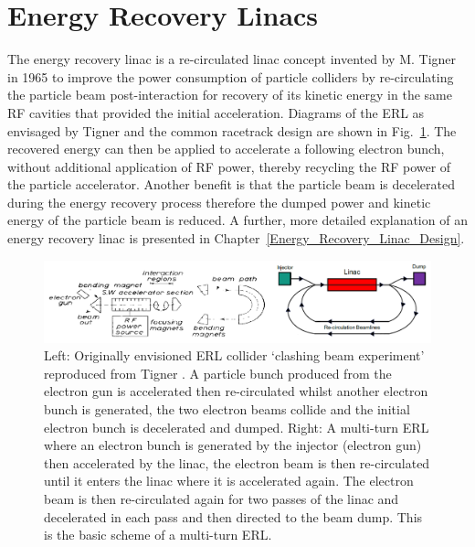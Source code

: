 \documentclass[../main.tex]{subfiles}
\begin{document}
\section{Energy Recovery Linacs}

The energy recovery linac is a re-circulated linac concept invented by M. Tigner in 1965 \cite{tigner1965possible} to improve the power consumption of particle colliders by re-circulating the particle beam post-interaction for recovery of its kinetic energy in the same RF cavities that provided the initial acceleration. Diagrams of the ERL as envisaged by Tigner and the common racetrack design are shown in Fig.~\ref{fig:tigner_modern_ERL}. The recovered energy can then be applied to accelerate a following electron bunch, without additional application of RF power, thereby recycling the RF power of the particle accelerator. Another benefit is that the particle beam is decelerated during the energy recovery process therefore the dumped power and kinetic energy of the particle beam is reduced. A further, more detailed explanation of an energy recovery linac is presented in Chapter~\ref{Energy_Recovery_Linac_Design}.
\begin{figure}[!h]
\centering
\includegraphics[width=\textwidth]{Figures/Introduction/Tigner_Modern_ERL.pdf}
\caption{Left: Originally envisioned ERL collider `clashing beam experiment' reproduced from Tigner \cite{tigner1965possible}. A  particle bunch produced from the electron gun is accelerated then re-circulated whilst another electron bunch is generated, the two electron beams collide and the initial electron bunch is decelerated and dumped. Right: A multi-turn ERL where an electron bunch is generated by the injector (electron gun) then accelerated by the linac, the electron beam is then re-circulated until it enters the linac where it is accelerated again. The electron beam is then re-circulated again for two passes of the linac and decelerated in each pass and then directed to the beam dump. This is the basic scheme of a multi-turn ERL.}
\label{fig:tigner_modern_ERL}
\end{figure}
\end{document}
